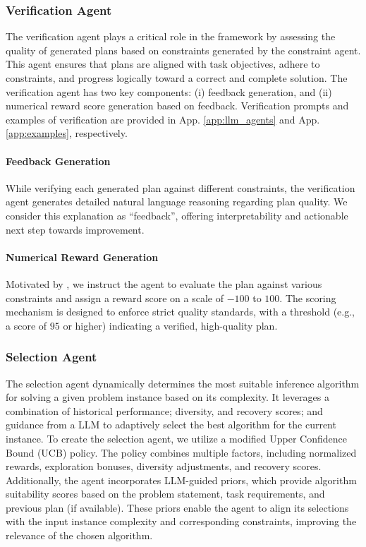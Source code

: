 \subsubsection{Verification Agent}
\label{subsec:verification}

The verification agent plays a critical role in the framework by assessing the quality of generated plans based on constraints generated by the constraint agent. This agent ensures that plans are aligned with task objectives, adhere to constraints, and progress logically toward a correct and complete solution. The verification agent has two key components: (i) feedback generation, and (ii) numerical reward score generation based on feedback. Verification prompts and examples of verification are provided in App. \ref{app:llm_agents} and App. \ref{app:examples}, respectively.

\paragraph{Feedback Generation}
While verifying each generated plan against different constraints, the verification agent generates detailed natural language reasoning regarding plan quality. We consider this explanation as ``feedback'', offering interpretability and actionable next step towards improvement.

\paragraph{Numerical Reward Generation}
Motivated by \citet{zhang2024accessing}, we instruct the agent to evaluate the plan against various constraints and assign a reward score on a scale of $-100$ to $100$. The scoring mechanism is designed to enforce strict quality standards, with a threshold (e.g., a score of $95$ or higher) indicating a verified, high-quality plan.

\subsubsection{Selection Agent}
\label{subsec:selection}

The selection agent dynamically determines the most suitable inference algorithm for solving a given problem instance based on its complexity. It leverages a combination of historical performance; diversity, and recovery scores; and guidance from a LLM to adaptively select the best algorithm for the current instance. To create the selection agent, we utilize a modified Upper Confidence Bound (UCB) policy. The policy combines multiple factors, including normalized rewards, exploration bonuses, diversity adjustments, and recovery scores. Additionally, the agent incorporates LLM-guided priors, which provide algorithm suitability scores based on the problem statement, task requirements, and previous plan (if available). These priors enable the agent to align its selections with the input instance complexity and corresponding constraints, improving the relevance of the chosen algorithm.

